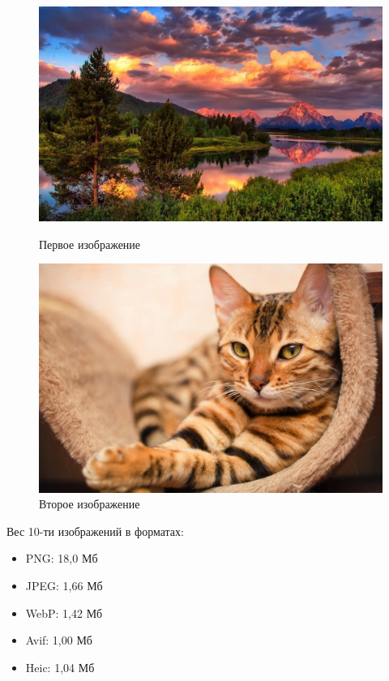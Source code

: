 \documentclass[12pt]{article}
\begin{document}
\begin{figure}[H]
    \centering
    \begin{minipage}{0.48\textwidth}
        \centering
        \includegraphics[width=\linewidth]{../images/image_comp/image1.png}
        \caption{Первое изображение}
        \label{fig:image1}
    \end{minipage}
    \hfill
    \begin{minipage}{0.48\textwidth}
        \centering
        \includegraphics[width=\linewidth]{../images/image_comp/image4.png}
        \caption{Второе изображение}
        \label{fig:image2}
    \end{minipage}
\end{figure}

Вес 10-ти изображений в форматах:

\begin{itemize}[label=-]
    \item PNG: 18,0 Мб
    \item JPEG: 1,66 Мб
    \item WebP: 1,42 Мб
    \item Avif: 1,00 Мб
    \item Heic: 1,04 Мб
\end{itemize}
\end{document}
